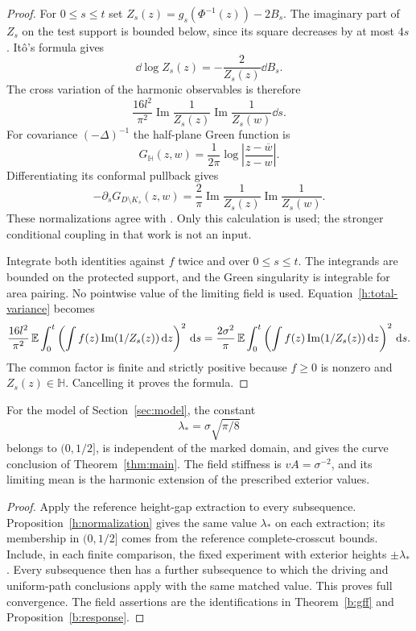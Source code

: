 \begin{proof}
For $0\le s\le t$ set
$Z_s(z)=g_s(\Phi^{-1}(z))-2B_s$. The imaginary part of $Z_s$ on the
test support is bounded below, since its square decreases by at most
$4s$. It\^o's formula gives
\[
 \dd\log Z_s(z)=-\frac{2}{Z_s(z)}\dd B_s.
\]
The cross variation of the harmonic observables is therefore
\begin{equation}\label{h:mean-bracket}
 \frac{16l^2}{\pi^2}
       \operatorname{Im}\frac1{Z_s(z)}
       \operatorname{Im}\frac1{Z_s(w)}\dd s.
\end{equation}
For covariance $(-\Delta)^{-1}$ the half-plane Green function is
\[
 G_{\mathbb H}(z,w)=\frac1{2\pi}
       \log\left|\frac{z-\overline w}{z-w}\right|.
\]
Differentiating its conformal pullback gives
\begin{equation}\label{h:green-loss}
 -\partial_sG_{D\setminus K_s}(z,w)=\frac2\pi
       \operatorname{Im}\frac1{Z_s(z)}
       \operatorname{Im}\frac1{Z_s(w)}.
\end{equation}
These normalizations agree with \cite[preprint version, Lemmas 2.5--2.6,
equations (2.3)--(2.4)]{SScontinuum}. Only this calculation is used;
the stronger conditional coupling in that work is not an input.

Integrate both identities against $f$ twice and over $0\le s\le t$.
The integrands are bounded on the protected support, and the Green
singularity is integrable for area pairing. No pointwise value of the
limiting field is used. Equation~\eqref{h:total-variance} becomes
\[
 \frac{16l^2}{\pi^2}\,
 \mathbb E\int_0^t\left(\int f(z)\operatorname{Im}(1/Z_s(z))\,\mathrm d z\right)^2\,\mathrm d s
 =
 \frac{2\sigma^2}{\pi}\,
 \mathbb E\int_0^t\left(\int f(z)\operatorname{Im}(1/Z_s(z))\,\mathrm d z\right)^2\,\mathrm d s.
\]
The common factor is finite and strictly positive because $f\ge0$
is nonzero and $Z_s(z)\in\mathbb H$. Cancelling it proves the formula.
\end{proof}

\begin{corollary}[Universality]\label{h:assembly}
For the model of Section~\ref{sec:model}, the constant
\[
 \lambda_*=\sigma\sqrt{\pi/8}
\]
belongs to $(0,1/2]$, is independent of the marked domain, and gives
the curve conclusion of Theorem~\ref{thm:main}. The field stiffness
is $vA=\sigma^{-2}$, and its limiting mean is the harmonic extension
of the prescribed exterior values.
\end{corollary}
\begin{proof}
Apply the reference height-gap extraction to every subsequence.
Proposition~\ref{h:normalization} gives the same value $\lambda_*$
on each extraction; its membership in $(0,1/2]$ comes from the
reference complete-crosscut bounds. Include, in each finite comparison,
the fixed experiment with exterior heights $\pm\lambda_*$.
Every subsequence then has a further subsequence to which the driving
and uniform-path conclusions apply with the same matched value.
This proves full convergence. The field assertions are the
identifications in Theorem~\ref{b:gff} and
Proposition~\ref{b:response}.
\end{proof}
